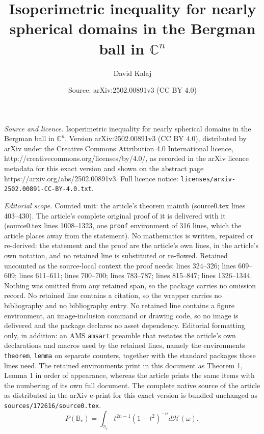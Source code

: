 \documentclass[10pt,a4paper]{amsart}
\title{Isoperimetric inequality for nearly spherical domains in the Bergman ball in $\mathbb{C}^n$}
\author{David Kalaj}
\date{Source: arXiv:2502.00891v3 (CC BY 4.0)}
\begin{document}
\maketitle

\noindent\emph{Source and licence.} Isoperimetric inequality for nearly spherical domains in the Bergman ball in $\mathbb{C}^n$. Version arXiv:2502.00891v3 (CC BY 4.0), distributed by arXiv under the Creative Commons Attribution 4.0 International licence, http://creativecommons.org/licenses/by/4.0/, as recorded in the arXiv licence metadata for this exact version and shown on the abstract page https://arxiv.org/abs/2502.00891v3. Full licence notice: \texttt{licenses/arxiv-2502.00891-CC-BY-4.0.txt}.\par\smallskip

\noindent\textit{Editorial scope.} Counted unit: the article's theorem mainth (source0.tex lines 403--430). The article's complete original proof of it is delivered with it (source0.tex lines 1008--1323, one \texttt{proof} environment of 316 lines, which the article places away from the statement). No mathematics is written, repaired or re-derived: the statement and the proof are the article's own lines, in the article's own notation, and no retained line is substituted or re-flowed.  Retained uncounted as the source-local context the proof needs: lines 324--326; lines 609--609; lines 611--611; lines 700--700; lines 783--787; lines 815--847; lines 1326--1344.  Nothing was omitted from any retained span, so the package carries no omission record.  No retained line contains a citation, so the wrapper carries no bibliography and no bibliography entry.  No retained line contains a figure environment, an image-inclusion command or drawing code, so no image is delivered and the package declares no asset dependency.  Editorial formatting only, in addition: an AMS \texttt{amsart} preamble that restates the article's own declarations and macros used by the retained lines, namely the environments \texttt{theorem}, \texttt{lemma} on separate counters, together with the standard packages those lines need.  The retained environments print in this document as Theorem 1, Lemma 1 in order of appearance, whereas the article prints the same items with the numbering of its own full document.  The complete native source of the article as distributed in the arXiv e-print for this exact version is bundled unchanged as \texttt{sources/172616/source0.tex}.
\begin{equation}\label{br}
P(\mathbb{B}_r) = \int_{\mathbb{S}_r}t^{2n-1}(1-t^2)^{-n} d\mathcal{H}(\omega),
\end{equation}
\end{document}
